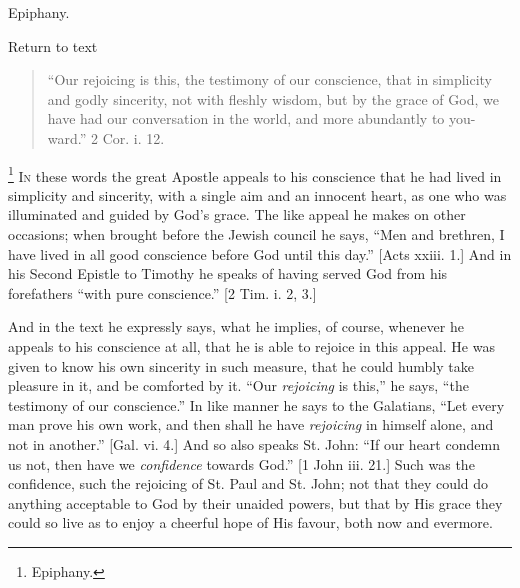 
Epiphany.

Return to text


\begin{quote}

``Our rejoicing is this, the testimony of our conscience,
that in simplicity and godly sincerity, not with fleshly wisdom, but
by the grace of God, we have had our conversation in the world, and
more abundantly to you-ward.'' 2 Cor. i. 12.

\end{quote}

\footnote{Epiphany.} I\textsc{n} these words the
great Apostle appeals to his conscience that he had lived in
simplicity and sincerity, with a single aim and an innocent heart, as
one who was illuminated and guided by God's grace. The like appeal he
makes on other occasions; when brought before the Jewish council he
says, ``Men and brethren, I have lived in all good conscience
before God until this day.'' [Acts xxiii. 1.] And in his Second
Epistle to Timothy he speaks of having served God from his forefathers
``with pure conscience.'' [2 Tim. i. 2, 3.]

And in the text he expressly says, what he implies, of course,
whenever he appeals to his conscience at all, that he is able to
rejoice in this appeal. He was given to know his own sincerity in such
measure, that he could humbly take pleasure in it, and be comforted by
it. ``Our \emph{rejoicing} is this,'' he says, ``the
testimony of our conscience.'' In like manner he says to the
Galatians, ``Let every man prove his own work, and then shall he
have \emph{rejoicing} in himself alone, and not in another.''
[Gal. vi. 4.] And so also speaks St. John: ``If our heart condemn
us not, then have we \emph{confidence} towards God.'' [1 John iii.
21.] Such was the confidence, such the rejoicing of St. Paul and St.
John; not that they could do anything acceptable to God by their
unaided powers, but that by His grace they could so live as to enjoy a
cheerful hope of His favour, both now and evermore.

